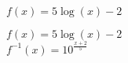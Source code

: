 {$f(x) = 5\log(x) - 2$}
{$f(x) = 5\log(x) - 2$\\
$f^{-1}(x) = 10^{\frac{x + 2}{5}}$\\

\begin{center}
\end{center}}


